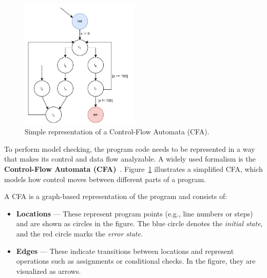 \begin{figure}
  \centering
  \includegraphics[width=0.5\textwidth]{figures/cfa_simple.pdf}
  \caption{Simple representation of a Control-Flow Automata (CFA). }
  \label{fig:cfa}
\end{figure}



To perform model checking, the program code needs to be represented in a way that makes its control and data flow analyzable. A widely used formalism is the \textbf{Control-Flow Automata (CFA)}~\cite{cfa}. Figure~\ref{fig:cfa} illustrates a simplified CFA, which models how control moves between different parts of a program.

A CFA is a graph-based  representation of the program and consists of:
\begin{itemize}
  \item \textbf{Locations} — These represent program points (e.g., line numbers or steps) and are shown as circles in the figure. The blue circle denotes the \textit{initial state}, and the red circle marks the \textit{error state}.
  \item \textbf{Edges} — These indicate transitions between locations and represent operations such as assignments or conditional checks. In the figure, they are visualized as arrows.
\end{itemize}

